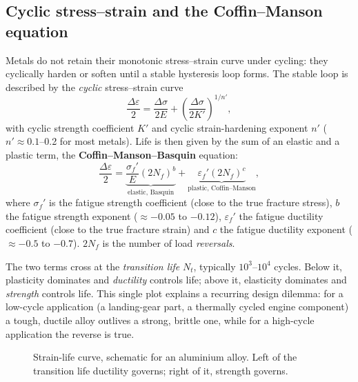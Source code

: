 \documentclass[11pt,a4paper]{article}
\begin{document}
\subsection{Cyclic stress--strain and the Coffin--Manson equation}
Metals do not retain their monotonic stress--strain curve under cycling: they cyclically harden or soften until a stable hysteresis loop forms. The stable loop is described by the \emph{cyclic} stress--strain curve
\begin{equation}
  \frac{\Delta\varepsilon}{2}=\frac{\Delta\sigma}{2E}+\left(\frac{\Delta\sigma}{2K'}\right)^{1/n'},
\end{equation}
with cyclic strength coefficient $K'$ and cyclic strain-hardening exponent $n'$ ($n'\approx0.1$--0.2 for most metals). Life is then given by the sum of an elastic and a plastic term, the \textbf{Coffin--Manson--Basquin} equation:
\begin{equation}
  \frac{\Delta\varepsilon}{2}=\underbrace{\frac{\sigma_f'}{E}(2N_f)^{b}}_{\text{elastic, Basquin}}+\underbrace{\varepsilon_f'(2N_f)^{c}}_{\text{plastic, Coffin--Manson}},
  \label{eq:cm}
\end{equation}
where $\sigma_f'$ is the fatigue strength coefficient (close to the true fracture stress), $b$ the fatigue strength exponent ($\approx-0.05$ to $-0.12$), $\varepsilon_f'$ the fatigue ductility coefficient (close to the true fracture strain) and $c$ the fatigue ductility exponent ($\approx-0.5$ to $-0.7$). $2N_f$ is the number of load \emph{reversals}.

The two terms cross at the \emph{transition life} $N_t$, typically $10^{3}$--$10^{4}$ cycles. Below it, plasticity dominates and \emph{ductility} controls life; above it, elasticity dominates and \emph{strength} controls life. This single plot explains a recurring design dilemma: for a low-cycle application (a landing-gear part, a thermally cycled engine component) a tough, ductile alloy outlives a strong, brittle one, while for a high-cycle application the reverse is true.

\begin{figure}[H]\centering
{}
\caption{Strain-life curve, schematic for an aluminium alloy. Left of the transition life ductility governs; right of it, strength governs.}
\label{fig:eps-n}
\end{figure}
\end{document}
